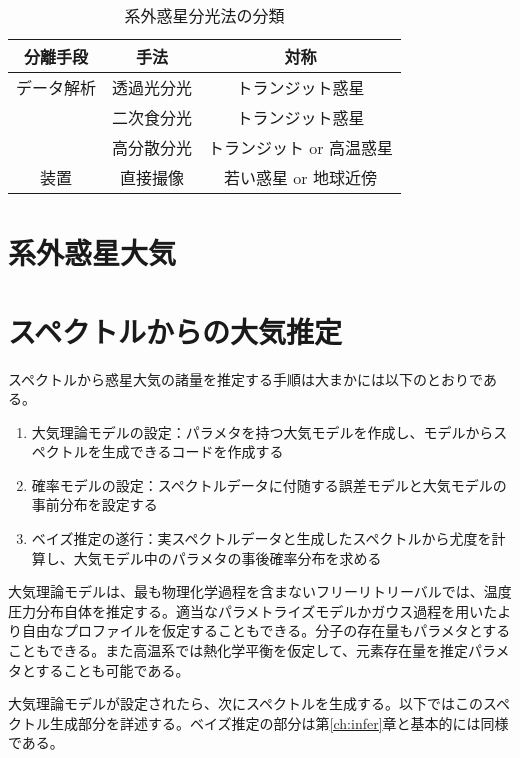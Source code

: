 \documentclass[xelatex,a4paper, twocolumn]{bxjsreport}
\begin{document}
\begin{table}[htbp]
\footnotesize
  \centering
  \caption{系外惑星分光法の分類}
  \label{tab:light_sep}
  \begin{tabular}{ccc}
    \hline
    分離手段 & 手法 & 対称 \\
    \hline
    データ解析 & 透過光分光 & トランジット惑星 \\
     & 二次食分光 & トランジット惑星 \\
     & 高分散分光 & トランジット or 高温惑星 \\
    \hline
    装置 & 直接撮像 & 若い惑星 or 地球近傍\\
    \hline
  \end{tabular}
\end{table}








\chapter{系外惑星大気}




\chapter{スペクトルからの大気推定}

スペクトルから惑星大気の諸量を推定する手順は大まかには以下のとおりである。
\begin{enumerate}
    \item 大気理論モデルの設定：パラメタを持つ大気モデルを作成し、モデルからスペクトルを生成できるコードを作成する
    \item 確率モデルの設定：スペクトルデータに付随する誤差モデルと大気モデルの事前分布を設定する 
    \item ベイズ推定の遂行：実スペクトルデータと生成したスペクトルから尤度を計算し、大気モデル中のパラメタの事後確率分布を求める
\end{enumerate}

大気理論モデルは、最も物理化学過程を含まないフリーリトリーバルでは、温度圧力分布自体を推定する。適当なパラメトライズモデルかガウス過程を用いたより自由なプロファイルを仮定することもできる。分子の存在量もパラメタとすることもできる。また高温系では熱化学平衡を仮定して、元素存在量を推定パラメタとすることも可能である。

大気理論モデルが設定されたら、次にスペクトルを生成する。以下ではこのスペクトル生成部分を詳述する。ベイズ推定の部分は第\ref{ch:infer}章と基本的には同様である。
\end{document}
